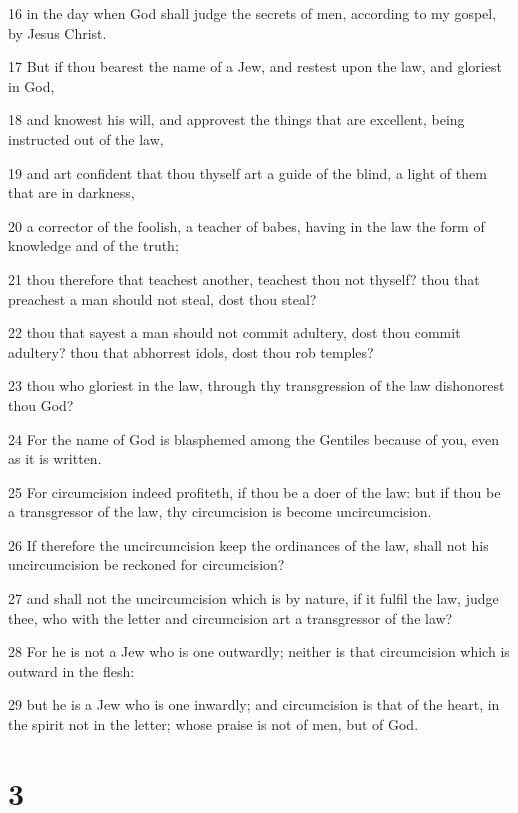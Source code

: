 \par 16 in the day when God shall judge the secrets of men, according to my gospel, by Jesus Christ.
\par 17 But if thou bearest the name of a Jew, and restest upon the law, and gloriest in God,
\par 18 and knowest his will, and approvest the things that are excellent, being instructed out of the law,
\par 19 and art confident that thou thyself art a guide of the blind, a light of them that are in darkness,
\par 20 a corrector of the foolish, a teacher of babes, having in the law the form of knowledge and of the truth;
\par 21 thou therefore that teachest another, teachest thou not thyself? thou that preachest a man should not steal, dost thou steal?
\par 22 thou that sayest a man should not commit adultery, dost thou commit adultery? thou that abhorrest idols, dost thou rob temples?
\par 23 thou who gloriest in the law, through thy transgression of the law dishonorest thou God?
\par 24 For the name of God is blasphemed among the Gentiles because of you, even as it is written.
\par 25 For circumcision indeed profiteth, if thou be a doer of the law: but if thou be a transgressor of the law, thy circumcision is become uncircumcision.
\par 26 If therefore the uncircumcision keep the ordinances of the law, shall not his uncircumcision be reckoned for circumcision?
\par 27 and shall not the uncircumcision which is by nature, if it fulfil the law, judge thee, who with the letter and circumcision art a transgressor of the law?
\par 28 For he is not a Jew who is one outwardly; neither is that circumcision which is outward in the flesh:
\par 29 but he is a Jew who is one inwardly; and circumcision is that of the heart, in the spirit not in the letter; whose praise is not of men, but of God.

\chapter{3}

